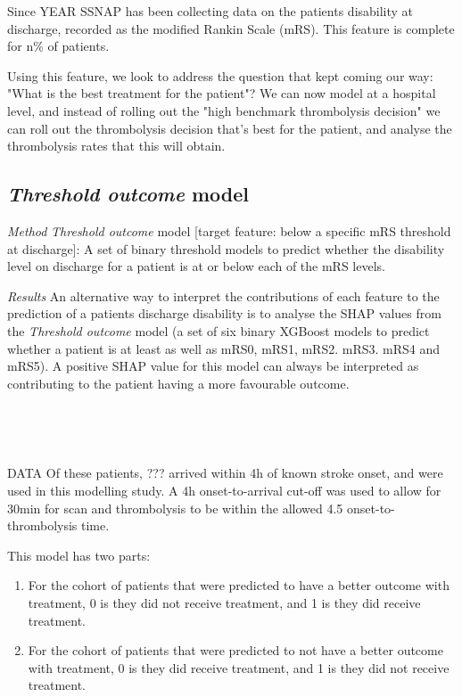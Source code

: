 Since YEAR SSNAP has been collecting data on the patients disability at discharge, recorded as the modified Rankin Scale (mRS). This feature is complete for n\% of patients.

Using this feature, we look to address the question that kept coming our way: "What is the best treatment for the patient"? We can now model at a hospital level, and instead of rolling out the "high benchmark thrombolysis decision" we can roll out the thrombolysis decision that's best for the patient, and analyse the thrombolysis rates that this will obtain.

\subsection{\textit{Threshold outcome} model}

\emph{Method}
\textit{Threshold outcome} model [target feature: below a specific mRS threshold at discharge]: A set of binary threshold models to predict whether the disability level on discharge for a patient is at or below each of the mRS levels. 

\emph{Results}
An alternative way to interpret the contributions of each feature to the prediction of a patients discharge disability is to analyse the SHAP values from the \textit{Threshold outcome} model (a set of six binary XGBoost models to predict whether a patient is at least as well as mRS0, mRS1, mRS2. mRS3. mRS4 and mRS5). A positive SHAP value for this model can always be interpreted as contributing to the patient having a more favourable outcome.

\begin{figure}
\\
\caption{}
\end{figure}

\begin{figure}
\\
\caption{}
\end{figure}



DATA
Of these patients, ??? arrived within 4h of known stroke onset, and were used in this modelling study. A 4h onset-to-arrival cut-off was used to allow for 30min for scan and thrombolysis to be within the allowed 4.5 onset-to-thrombolysis time.


 This model has two parts:
\begin{enumerate}
    \item For the cohort of patients that were predicted to have a better outcome with treatment, 0 is they did not receive treatment, and 1 is they did receive treatment.
    \item For the cohort of patients that were predicted to not have a better outcome with treatment, 0 is they did receive treatment, and 1 is they did not receive treatment.
\end{enumerate}



